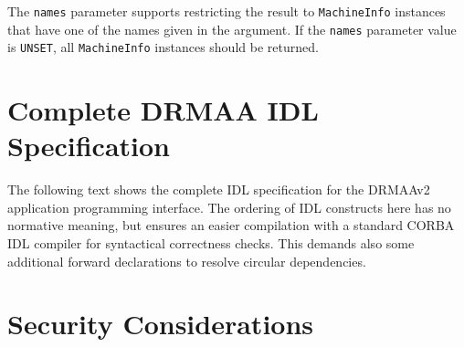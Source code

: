 \documentclass{article}
\newcommand{\h}[1]{\lstinline|#1|}
\begin{document}
The \h{names} parameter supports restricting the result to \h{MachineInfo} instances that have one of the names given in the argument. If the \h{names} parameter value is \h{UNSET}, all \h{MachineInfo} instances should be returned.

\section{Complete DRMAA IDL Specification}
\label{sec:idl}

The following text shows the complete IDL specification for the DRMAAv2 application programming interface. The ordering of IDL constructs here has no normative meaning, but ensures an easier compilation with a standard CORBA IDL compiler for syntactical correctness checks. This demands also some additional forward declarations to resolve circular dependencies.






























\section{Security Considerations}
\label{sec:security}
\end{document}

